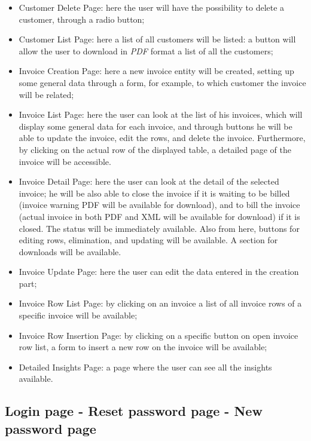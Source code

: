 \begin{itemize}
    \item Customer Delete Page: here the user will have the possibility to delete a customer, through a radio button;
    \item Customer List Page: here a list of all customers will be listed: a button will allow the user to download in \textit{PDF} format a list of all the customers;
    \item Invoice Creation Page: here a new invoice entity will be created, setting up some general data through a form, for example, to which customer the invoice will be related;
    \item Invoice List Page: here the user can look at the list of his invoices, which will display some general data for each invoice, and through buttons he will be able to update the invoice, edit the rows, and delete the invoice. Furthermore, by clicking on the actual row of the displayed table, a detailed page of the invoice will be accessible. 
    \item Invoice Detail Page: here the user can look at the detail of the selected invoice; he will be also able to close the invoice if it is waiting to be billed (invoice warning PDF will be available for download), and to bill the invoice (actual invoice in both PDF and XML will be available for download) if it is closed. The status will be immediately available. Also from here, buttons for editing rows, elimination, and updating will be available. A section for downloads will be available.
    \item Invoice Update Page: here the user can edit the data entered in the creation part;
    \item Invoice Row List Page: by clicking on an invoice a list of all invoice rows of a specific invoice will be available;
    \item Invoice Row Insertion Page: by clicking on a specific button on open invoice row list, a form to insert a new row on the invoice will be available;
    \item Detailed Insights Page: a page where the user can see all the insights available.
\end{itemize}


\newpage
\subsection{Login page - Reset password page - New password page}

